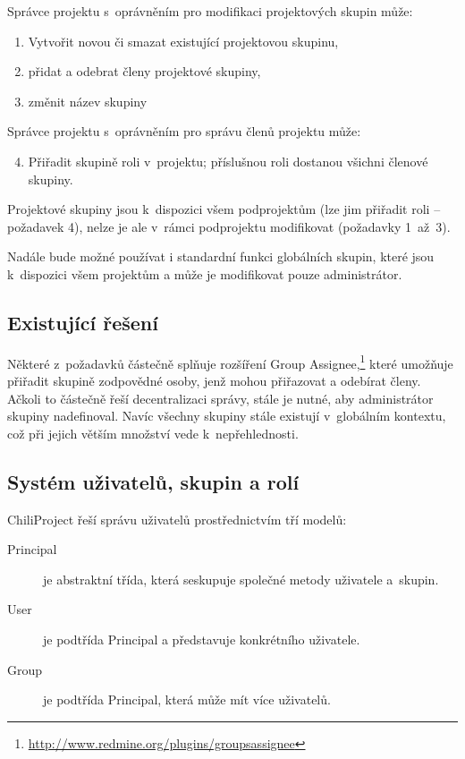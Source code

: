 \documentclass[thesis=B,czech]{FITthesis}[2012/05/02]
\begin{document}
\vspace{3mm}

Správce projektu s~oprávněním pro modifikaci projektových skupin může:
\begin{enumerate}
\item
  Vytvořit novou či smazat existující projektovou skupinu,
\item
  přidat a odebrat členy projektové skupiny,
\item
  změnit název skupiny
\end{enumerate}
\newpage

Správce projektu s~oprávněním pro správu členů projektu může:

\begin{enumerate}
\setcounter{enumi}{3}
\item
  Přiřadit skupině roli v~projektu; příslušnou roli dostanou všichni
  členové skupiny.
\end{enumerate}
Projektové skupiny jsou k~dispozici všem podprojektům (lze jim přiřadit
roli -- požadavek 4), nelze je ale v~rámci podprojektu modifikovat
(požadavky 1~až~3).

Nadále bude možné používat i standardní funkci globálních skupin, které
jsou k~dispozici všem projektům a může je modifikovat pouze
administrátor.

\subsection{Existující řešení}

Některé z~požadavků částečně splňuje rozšíření Group Assignee,\footnote{\url{http://www.redmine.org/plugins/groupsassignee}}
které umožňuje přiřadit skupině zodpovědné osoby, jenž mohou přiřazovat a
odebírat členy. Ačkoli to částečně řeší decentralizaci správy, stále je
nutné, aby administrátor skupiny nadefinoval. Navíc všechny skupiny stále
existují v~globálním kontextu, což při jejich větším množství vede
k~nepřehlednosti.

\subsection{Systém uživatelů, skupin a rolí}

\label{sec:proj_group_sys}

ChiliProject řeší správu uživatelů prostřednictvím tří modelů:

\begin{description}
\item[Principal] je abstraktní třída, která seskupuje společné metody
  uživatele \mbox{a skupin}.
\item[User] je podtřída Principal a představuje konkrétního
  uživatele.
\item[Group] je podtřída Principal, která může mít více uživatelů.
\end{description}
\end{document}
